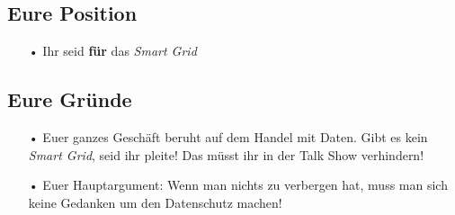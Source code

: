 \documentclass[11pt,a4paper,DIV=10,parskip=half,BCOR=0mm]{scrartcl}
\begin{document}
\subsection*{Eure Position}
\begin{enumerate}
	\item[•]Ihr seid \textbf{für} das \textit{Smart Grid}
\end{enumerate}
\subsection*{Eure Gründe}
\begin{enumerate}
	\item[•]Euer ganzes Geschäft beruht auf dem Handel mit Daten. Gibt es
	kein \textit{Smart Grid}, seid ihr pleite! Das müsst ihr in der Talk Show
	verhindern!
	\item[•] Euer Hauptargument: \glqq Wenn man nichts zu verbergen hat, muss man sich keine Gedanken um den Datenschutz machen!\grqq
\end{enumerate}
\end{document}
